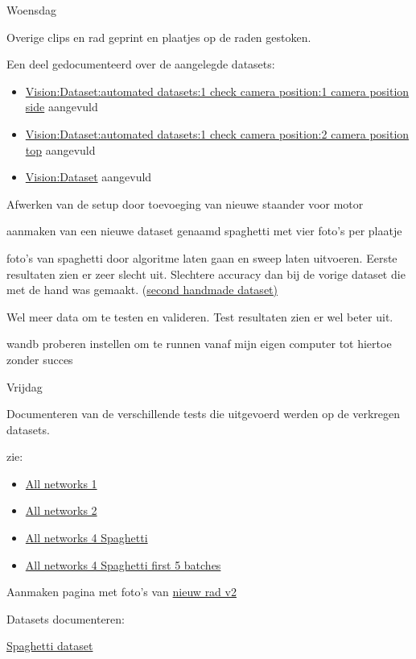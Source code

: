 \documentclass{scrartcl}
\begin{document}
Woensdag

Overige clips en rad geprint en plaatjes op de raden gestoken. 

Een deel gedocumenteerd over de aangelegde datasets:

\begin{itemize}
\item \href{../../Vision/Dataset/automated_datasets/1_check_camera_position/1_camera_position_side.tex}{Vision:Dataset:automated datasets:1 check camera position:1 camera position side} aangevuld
\item \href{../../Vision/Dataset/automated_datasets/1_check_camera_position/2_camera_position_top.tex}{Vision:Dataset:automated datasets:1 check camera position:2 camera position top} aangevuld
\item \href{../../Vision/Dataset.tex}{Vision:Dataset} aangevuld
\end{itemize}




Afwerken van de setup door toevoeging van nieuwe staander voor motor

aanmaken van een nieuwe dataset genaamd spaghetti met vier foto's per plaatje



foto's van spaghetti door algoritme laten gaan en sweep laten uitvoeren. Eerste resultaten zien er zeer slecht uit. Slechtere accuracy dan bij de vorige dataset die met de hand was gemaakt. (\href{../../Vision/Dataset/handmade_datasets/Second_handmade_dataset.tex}{second handmade dataset)}

Wel meer data om te testen en valideren. Test resultaten zien er wel beter uit.



wandb proberen instellen om te runnen vanaf mijn eigen computer tot hiertoe zonder succes



Vrijdag

Documenteren van de verschillende tests die uitgevoerd werden op de verkregen datasets.

zie:

\begin{itemize}
\item \href{../../Vision/GoogleColab/Test_Camera_Setup/All_Networks/All_Networks_1.tex}{All networks 1}
\item \href{../../Vision/GoogleColab/Test_Camera_Setup/All_Networks/All_Networks_2.tex}{All networks 2}
\item \href{../../Vision/GoogleColab/Test_Camera_Setup/All_Networks/All_Networks_4_Spaghetti.tex}{All networks 4 Spaghetti}
\item \href{../../Vision/GoogleColab/Test_Camera_Setup/All_Networks/All_networks_4_spaghetti_first_5_batches.tex}{All networks 4 Spaghetti first 5 batches}
\end{itemize}


Aanmaken pagina met foto's van \href{../../Camera_setup/Tool_Holder/Wheel_Holder/Second_Wheel_Holder.tex}{nieuw rad v2}



Datasets documenteren:

\href{../../Vision/Dataset/automated_datasets/2_created_datasets/2_Spaghetti_dataset.tex}{Spaghetti dataset}
\end{document}
